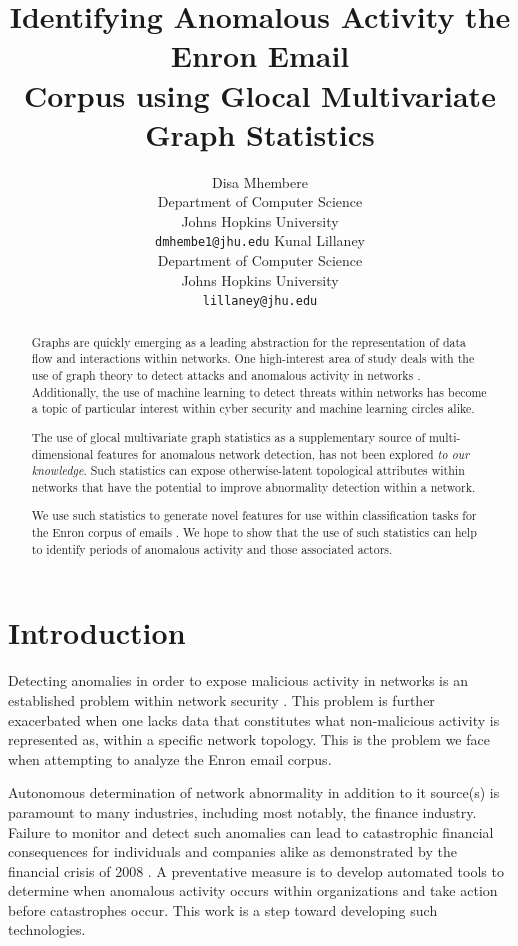 \documentclass[11pt,letterpaper]{article}
\title{Identifying Anomalous Activity the Enron Email \\
				Corpus using Glocal Multivariate Graph Statistics}
\author{Disa Mhembere\\
  Department of Computer Science\\
  Johns Hopkins University\\
  {\tt dmhembe1@jhu.edu}
  \And
  Kunal Lillaney \\
  Department of Computer Science\\
  Johns Hopkins University\\
  {\tt lillaney@jhu.edu}}
\date{}
\begin{document}
\maketitle
\begin{abstract}
Graphs are quickly emerging as a leading abstraction for the representation of data
flow and interactions within networks. One high-interest area of study deals with 
the use of graph theory to detect attacks and anomalous activity in networks 
\cite{priebe2005scan,park2009anomaly,park2013anomaly}.
Additionally, the use of machine learning to detect threats within networks 
has become a topic of particular interest 
\cite{mahoney2003machine,shon2005machine,sommer2010outside,shon2007hybrid} within
cyber security and machine learning circles alike.

The use of glocal multivariate graph statistics \cite{mhembere2013computing} as 
a supplementary source of multi-dimensional features for anomalous network detection,
has not been explored \textit{to our knowledge}. Such statistics can expose 
otherwise-latent topological attributes within networks that have the potential 
to improve abnormality detection within a network.

We use such statistics to generate novel features for use within
classification tasks for the Enron corpus of emails \cite{enronrepo2009}.
We hope to show that the use of such statistics can help to identify periods of
anomalous activity and those associated actors.
\end{abstract}


\section{Introduction}
Detecting anomalies in order to expose malicious activity in networks is an
established problem within network security \cite{roesch1999snort,zhang2000intrusion}.
This problem is further exacerbated when one lacks data that constitutes what non-malicious
activity is represented as, within a specific network topology. This is the problem
we face when attempting to analyze the Enron email corpus. 

Autonomous determination of network abnormality in addition to it source(s) is paramount
to many industries, including most notably, the finance industry.
Failure to monitor and detect such anomalies can lead to catastrophic financial
consequences for individuals and companies alike as demonstrated by the financial 
crisis of 2008 \cite{grigor2009financial}. A preventative measure is to develop automated tools
to determine when anomalous activity occurs within organizations and take action before
catastrophes occur. This work is a step toward developing such technologies.
\end{document}
